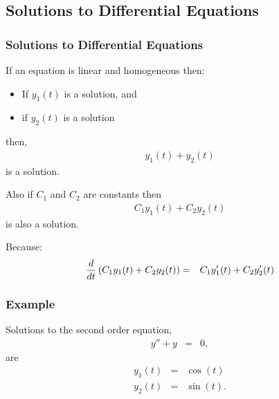 \subsection{Solutions to Differential Equations}

\begin{frame}
  \frametitle{Solutions to Differential Equations}

  If an equation is linear and homogeneous then:
  \begin{itemize}
  \item If $y_1(t)$ is a solution, and
  \item if $y_2(t)$ is a solution
  \end{itemize}

  then, 
  \begin{eqnarray*}
    y_1(t) + y_2(t)
  \end{eqnarray*}
  is a solution.

  Also if $C_1$ and $C_2$ are constants then
  \begin{eqnarray*}
    C_1 y_1(t) + C_2 y_2(t)
  \end{eqnarray*}
  is also a solution.

  Because:
  \begin{eqnarray*}
    \frac{d}{dt} \left( C_1 y_1(t) + C_2 y_2(t) \right) & = & 
    C_1 y_1'(t) + C_2 y_2'(t)
  \end{eqnarray*}


\end{frame}


\begin{frame}
  \frametitle{Example}

  Solutions to the second order equation,
  \begin{eqnarray*}
    y'' + y & = & 0,
  \end{eqnarray*}
  are
  \begin{eqnarray*}
    y_1(t) & = & \cos(t) \\
    y_2(t) & = & \sin(t).
  \end{eqnarray*}


\end{frame}

